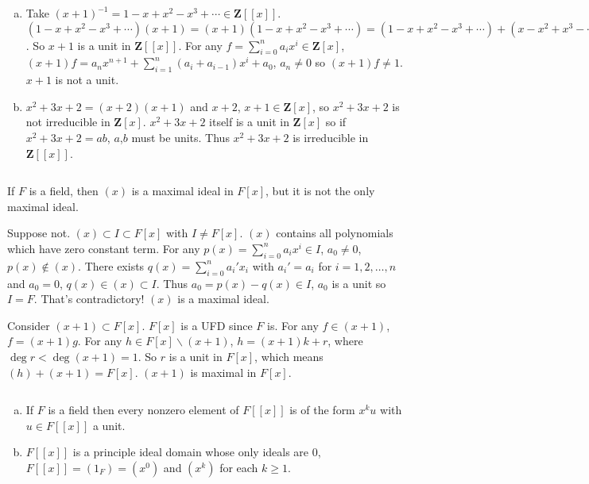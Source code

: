 \begin{answer}
    \begin{enumerate}[(a)]
        \item Take $(x+1)^{-1}=1-x+x^{2}-x^{3}+\cdots\in \mathbf{Z}[[x]]$. $(1-x+x^{2}-x^{3}+\cdots)(x+1)=(x+1)(1-x+x^{2}-x^{3}+\cdots)=(1-x+x^{2}-x^{3}+\cdots)+(x-x^{2}+x^{3}-\cdots)=1$. So $x+1$ is a unit in $\mathbf{Z}[[x]]$. For any $f=\sum\limits_{i=0}^{n}a_{i}x^{i}\in\mathbf{Z}[x]$, $(x+1)f=a_{n}x^{n+1}+\sum\limits_{i=1}^{n}(a_{i}+a_{i-1})x^{i}+a_{0}$, $a_{n}\neq 0$ so $(x+1)f\neq 1$. $x+1$ is not a unit.
        \item $x^{2}+3x+2=(x+2)(x+1)$ and $x+2$, $x+1\in \mathbf{Z}[x]$, so $x^{2}+3x+2$ is not irreducible in $\mathbf{Z}[x]$. $x^{2}+3x+2$ itself is a unit in $\mathbf{Z}[x]$ so if $x^{2}+3x+2=ab$, $a$,$b$ must be units. Thus $x^{2}+3x+2$ is irreducible in $\mathbf{Z}[[x]]$.
    \end{enumerate}
\end{answer}

$$ $$

\begin{ex}
    If $F$ is a field, then $(x)$ is a maximal ideal in $F[x]$, but it is not the only maximal ideal.
\end{ex}

\begin{answer}
    Suppose not. $(x)\subset I\subset F[x]$ with $I\neq F[x]$. $(x)$ contains all polynomials which have zero constant term. For any $p(x)=\sum\limits_{i=0}^{n}a_{i}x^{i}\in I$, $a_{0}\neq 0$, $p(x)\notin (x)$. There exists $q(x)=\sum\limits_{i=0}^{n}a_{i}'x_{i}$ with $a_{i}'=a_{i}$ for $i=1,2,\dots,n$ and $a_{0}=0$, $q(x)\in (x)\subset I$. Thus $a_{0}=p(x)-q(x)\in I$, $a_{0}$ is a unit so $I=F$. That's contradictory! $(x)$ is a maximal ideal.
    
    Consider $(x+1)\subset F[x]$. $F[x]$ is a UFD since $F$ is. For any $f\in (x+1)$, $f=(x+1)g$. For any $h\in F[x]\backslash(x+1)$, $h=(x+1)k+r$, where $\deg r<\deg (x+1)=1$. So $r$ is a unit in $F[x]$, which means $(h)+(x+1)=F[x]$. $(x+1)$ is maximal in $F[x]$.
\end{answer}

$$ $$

\begin{ex}
    \begin{enumerate}[(a)]
        \item If $F$ is a field then every nonzero element of $F[[x]]$ is of the form $x^{k}u$ with $u\in F[[x]]$ a unit.
        \item $F[[x]]$ is a principle ideal domain whose only ideals are 0, $F[[x]]=(1_{F})=(x^{0})$ and $(x^{k})$ for each $k\geq 1$.
    \end{enumerate}
\end{ex}

